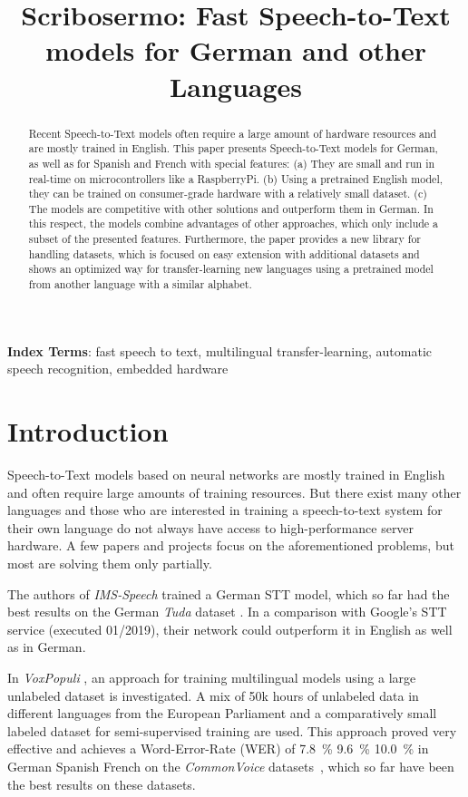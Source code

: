 \documentclass[a4paper]{article}
\title{Scribosermo: Fast Speech-to-Text models for German and other Languages}
\begin{document}
\maketitle
  
\begin{abstract}
	Recent Speech-to-Text models often require a large amount of hardware resources and are mostly trained in English. This paper presents Speech-to-Text models for German, as well as for Spanish and French with special features:
	(a) They are small and run in real-time on microcontrollers like a RaspberryPi.
	(b) Using a pretrained English model, they can be trained on consumer-grade hardware with a relatively small dataset.
	(c) The models are competitive with other solutions and outperform them in German.
	In this respect, the models combine advantages of other approaches, which only include a subset of the presented features.
	Furthermore, the paper provides a new library for handling datasets, which is focused on easy extension with additional datasets and shows an optimized way for transfer-learning new languages using a pretrained model from another language with a similar alphabet.
\end{abstract}

\noindent\textbf{Index Terms}: fast speech to text, multilingual transfer-learning, automatic speech recognition, embedded hardware



\section{Introduction}
\label{sec:intro}

Speech-to-Text models based on neural networks are mostly trained in English and often require large amounts of training resources. But there exist many other languages and those who are interested in training a speech-to-text system for their own language do not always have access to high-performance server hardware. A few papers and projects focus on the aforementioned problems, but most are solving them only partially.

\vspace{9pt}
The authors of \textit{IMS-Speech} \cite{IMSDE} trained a German STT model, which so far had the best results on the German \textit{Tuda} dataset \cite{TUDA}. In a comparison with Google's STT service (executed 01/2019), their network could outperform it in English as well as in German.

In \textit{VoxPopuli} \cite{VOXPOP}, an approach for training multilingual models using a large unlabeled dataset is investigated. A mix of 50k hours of unlabeled data in different languages from the European Parliament and a comparatively small labeled dataset for semi-supervised training are used. This approach proved very effective and achieves a Word-Error-Rate (WER) of \SI{7.8}{\percent}\,\,\SI{9.6}{\percent}\,\,\SI{10.0}{\percent} in German\,\,Spanish\,\,French on the \textit{CommonVoice} datasets~\cite{COMV}, which so far have been the best results on these datasets.
\end{document}
